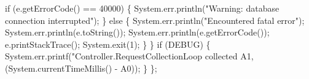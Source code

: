     if (e.getErrorCode() == 40000) \{
      System.err.println("Warning: database connection interrupted");
    \} else \{
      System.err.println("Encountered fatal error");
      System.err.println(e.toString());
      System.err.println(e.getErrorCode());
      e.printStackTrace();
      System.exit(1);
    \}
  \}
  if (DEBUG) \{
    System.err.printf("Controller.RequestCollectionLoop collected %
        A1, (System.currentTimeMillis() - A0));
  \}
\};
\nwendcode{}\nwdocspar

